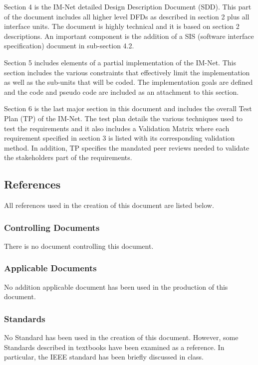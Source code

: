 \documentclass[letterpaper]{article}
\begin{document}
Section 4 is the IM-Net detailed Design Description Document (SDD). This part of the document includes all higher level DFDs as described in section 2 plus all interface units. The document is highly technical and it is based on section 2 descriptions. An important component is the addition of a SIS (software interface specification) document in sub-section 4.2.

Section 5 includes elements of a partial implementation of the IM-Net. This section includes the various constraints that effectively limit the implementation as well as the sub-units that will be coded. The implementation goals are defined and the code and pseudo code are included as an attachment to this section.  

Section 6 is the last major section in this document and includes the overall Test Plan (TP) of the IM-Net. The test plan details the various techniques used to test the requirements and it also includes a Validation Matrix where each requirement specified in section 3 is listed with its corresponding validation method. In addition, TP specifies the mandated peer reviews needed to validate the stakeholders part of the requirements.

 
\subsection{References}

All references used in the creation of this document are listed below.

\subsubsection{Controlling Documents}

There is no document controlling this document.

\subsubsection{Applicable Documents}

No addition applicable document has been used in the production of this document.

\subsubsection{Standards}

No Standard has been used in the creation of this document. However, some Standards described in textbooks have been examined as a reference. In particular, the IEEE standard has been briefly discussed in class.
\end{document}
